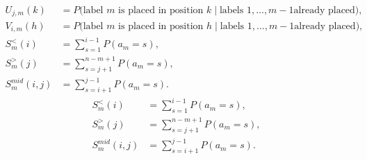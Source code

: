 \documentclass[mat2, tisk]{fmfdelo}
\begin{document}

            \begin{align}
              U_{j,m}(k) &= P\big(\text{label } m \text{ is placed in
                position } k \mid \text{labels } 1,\dots,m-1 \text{
              already placed}\big), \\
              V_{i,m}(h) &= P\big(\text{label } m \text{ is placed in
                position } h \mid \text{labels } 1,\dots,m-1 \text{
              already placed}\big), \\
              S^<_m(i) &= \sum_{s=1}^{i-1} P(a_m = s), \\
              S^>_m(j) &= \sum_{s=j+1}^{n-m+1} P(a_m = s), \\
              S^{mid}_m(i,j) &= \sum_{s=i+1}^{j-1} P(a_m = s).
            \end{align}
            \begin{align}
              S^<_m(i) &= \sum_{s=1}^{i-1} P(a_m = s), \\
              S^>_m(j) &= \sum_{s=j+1}^{n-m+1} P(a_m = s), \\
              S^{mid}_m(i,j) &= \sum_{s=i+1}^{j-1} P(a_m = s).
            \end{align}
\end{document}
